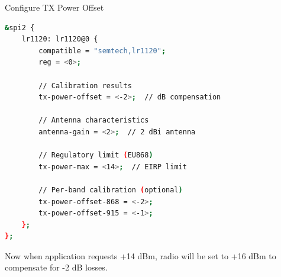 \documentclass{beamer}
\begin{document}
\begin{frame}[fragile]{Configure TX Power Offset}
\begin{lstlisting}[language=bash, caption={Device Tree TX Power Configuration}]
&spi2 {
    lr1120: lr1120@0 {
        compatible = "semtech,lr1120";
        reg = <0>;

        // Calibration results
        tx-power-offset = <-2>;  // dB compensation

        // Antenna characteristics
        antenna-gain = <2>;  // 2 dBi antenna

        // Regulatory limit (EU868)
        tx-power-max = <14>;  // EIRP limit

        // Per-band calibration (optional)
        tx-power-offset-868 = <-2>;
        tx-power-offset-915 = <-1>;
    };
};
\end{lstlisting}

\vspace{0.3cm}

Now when application requests +14 dBm, radio will be set to +16 dBm to compensate for -2 dB losses.
\end{frame}
\end{document}
